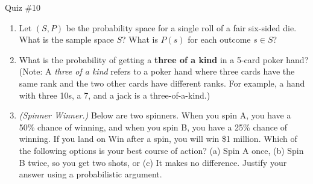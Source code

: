 \documentclass[10pt]{beamer}
\begin{document}
\begin{frame}{Quiz \#10}
\small 

\begin{enumerate}
	\item Let $(S,P)$ be the probability space for a single roll of a fair six-sided die. What is the sample space $S$? What is $P(s)$ for each outcome $s \in S$?
	\item  What is the probability of getting a \textbf{three of a kind} in a 5-card poker hand?      (Note: A \textit{three of a kind} refers to a poker hand where three cards have the same rank and the two other cards have different ranks.  For example, a hand with three 10s, a 7, and a jack is a three-of-a-kind.) 
	\item \textit{(Spinner Winner.)}  Below are two spinners. When you spin A, you have a 50\% chance of winning, and when you spin B, you have a 25\% chance of winning.  If you land on Win after a spin, you will win \$1 million.  Which of the following options is your best course of action? (a) Spin A once, (b) Spin B twice, so you get two shots, or (c) It makes no difference. Justify your answer using a probabilistic argument.
\end{enumerate}

\centering
\def\r{1.3}%

\end{frame}


\end{document}
